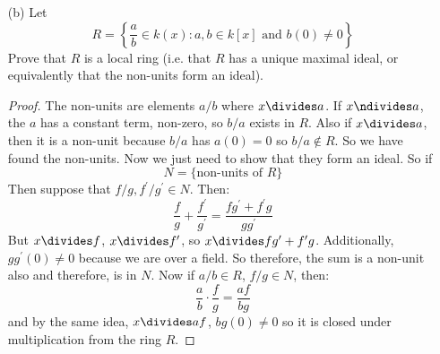 \documentclass{article}
\begin{document}
\begin{itemize}
        \item [(b)] Let 
            \begin{equation*}
                R = \left\{\dfrac{a}{b} \in k(x) : a, b \in k[x] \text{ and }b(0) \neq 0\right\}
            \end{equation*}
        Prove that $R$ is a local ring (i.e. that $R$ has a unique maximal ideal, or equivalently that the non-units form an ideal).
            \begin{proof}
                The non-units are elements $a/b$ where $x \divides a$. If $x \ndivides a$, the $a$ has a constant term, non-zero, so $b/a$ exists in $R$. Also if $x \divides a$, then it is a non-unit because $b/a$ has $a(0) = 0$ so $b/a \notin R$. So we have found the non-units. Now we just need to show that they form an ideal. So if 
                    \begin{equation*}
                        N = \{\text{non-units of $R$}\}
                    \end{equation*}
                Then suppose that $f/g, f^{\prime}/g^{\prime} \in N$. Then:
                    \begin{equation*}
                        \dfrac{f}{g} + \dfrac{f^{\prime}}{g^{\prime}} = \dfrac{fg^{\prime} + f^{\prime}g}{gg^{\prime}}
                    \end{equation*}
                But $x \divides f$, $x \divides f^{\prime}$, so $x \divides fg^{\prime} + f^{\prime}g$. Additionally, $gg^{\prime}(0) \neq 0$ because we are over a field. So therefore, the sum is a non-unit also and therefore, is in $N$. Now if $a/b \in R$, $f/g \in N$, then:
                    \begin{equation*}
                        \dfrac{a}{b} \cdot \dfrac{f}{g} = \dfrac{af}{bg}
                    \end{equation*}
                and by the same idea, $x \divides af$, $bg(0) \neq 0$ so it is closed under multiplication from the ring $R$.
            \end{proof}
    \end{itemize}
\end{document}
